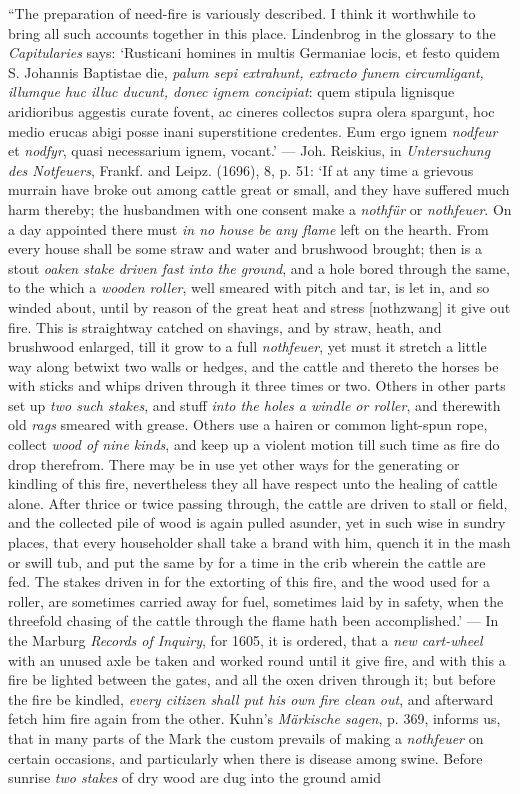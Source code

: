 \documentclass[a4paper, 11pt, oneside, polutonikogreek, english]{article}
\begin{document}
``The preparation of need-fire is variously described. I think it worthwhile to bring all such accounts together in this place. Lindenbrog in the glossary to the \emph{Capitularies} says: `Rusticani homines in multis Germaniae locis, et festo quidem S. Johannis Baptistae die, \emph{palum sepi extrahunt, extracto funem circumligant, illumque huc illuc ducunt, donec ignem concipiat}: quem stipula lignisque aridioribus aggestis curate fovent, ac cineres collectos supra olera spargunt, hoc medio erucas abigi posse inani superstitione credentes. Eum ergo ignem \emph{nodfeur} et \emph{nodfyr}, quasi necessarium ignem, vocant.' --- Joh. Reiskius, in \emph{Untersuchung des Notfeuers}, Frankf. and Leipz. (1696), 8, p. 51: `If at any time a grievous murrain have broke out among cattle great or small, and they have suffered much harm thereby; the husbandmen with one consent make a \emph{nothfür} or \emph{nothfeuer}. On a day appointed there must \emph{in no house be any flame} left on the hearth. From every house shall be some straw and water and brushwood brought; then is a stout \emph{oaken stake driven fast into the ground}, and a hole bored through the same, to the which a \emph{wooden roller}, well smeared with pitch and tar, is let in, and so winded about, until by reason of the great heat and stress [nothzwang] it give out fire. This is straightway catched on shavings, and by straw, heath, and brushwood enlarged, till it grow to a full \emph{nothfeuer}, yet must it stretch a little way along betwixt two walls or hedges, and the cattle and thereto the horses be with sticks and whips driven through it three times or two. Others in other parts set up \emph{two such stakes}, and stuff \emph{into the holes a windle or roller}, and therewith old \emph{rags} smeared with grease. Others use a hairen or common light-spun rope, collect \emph{wood of nine kinds}, and keep up a violent motion till such time as fire do drop therefrom. There may be in use yet other ways for the generating or kindling of this fire, nevertheless they all have respect unto the healing of cattle alone. After thrice or twice passing through, the cattle are driven to stall or field, and the collected pile of wood is again pulled asunder, yet in such wise in sundry places, that every householder shall take a brand with him, quench it in the mash or swill tub, and put the same by for a time in the crib wherein the cattle are fed. The stakes driven in for the extorting of this fire, and the wood used for a roller, are sometimes carried away for fuel, sometimes laid by in safety, when the threefold chasing of the cattle through the flame hath been accomplished.' --- In the Marburg \emph{Records of Inquiry}, for 1605, it is ordered, that a \emph{new cart-wheel} with an unused axle be taken and worked round until it give fire, and with this a fire be lighted between the gates, and all the oxen driven through it; but before the fire be kindled, \emph{every citizen shall put his own fire clean out}, and afterward fetch him fire again from the other. Kuhn's \emph{Märkische sagen}, p. 369, informs us, that in many parts of the Mark the custom prevails of making a \emph{nothfeuer} on certain occasions, and particularly when there is disease among swine. Before sunrise \emph{two stakes} of dry wood are dug into the ground amid 
\end{document}
